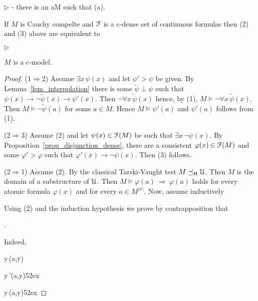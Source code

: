 \documentclass[10pt,oneside]{amsproc}
\newcommand{\mylabel}[1]{{#1}\hfill}
\renewenvironment{itemize}
  {\begin{list}{$\triangleright$}{%
  \setlength{\parskip}{0mm}
  \setlength{\topsep}{.4\baselineskip}
  \setlength{\rightmargin}{0mm}
  \setlength{\listparindent}{0mm}
  \setlength{\itemindent}{0mm}
  \setlength{\labelwidth}{3ex}
  \setlength{\itemsep}{.2\baselineskip}
  \setlength{\parsep}{.2\baselineskip}
  \setlength{\partopsep}{0mm}
  \setlength{\labelsep}{1ex}
  \setlength{\leftmargin}{\labelwidth+\labelsep}
  \let\makelabel\mylabel}}{%
\end{list}}
\def\forallH{\forall}
\begin{document}
{\begin{proposition}
\begin{itemize}
    \noindent\kern-\leftmargin
    {\textrm{ there is an }a\in M\textrm{ such that }\neg\psi(a).}
  \end{itemize}
  If $M$ is Cauchy compelte and ${\EuScript F}$ is a c-dense set of continuous formulas then (2) and (3) above are equivalent to
  \begin{itemize}
    \item[1$'$.] $M$ is a c-model.
  \end{itemize}
\end{proposition}

\begin{proof}
  (1$\Rightarrow$2) Assume $\exists x\,\psi(x)$ and let $\psi'>\psi$ be given.
  By Lemma~\ref{lem_interpolation} there is some $\tilde{\psi}\perp\psi$ such that  $\psi(x)\rightarrow\neg\tilde{\psi}(x)\rightarrow\psi'(x)$.
  Then $\neg\forallH x\,\tilde{\psi}(x)$ hence, by (1), $M\models\neg\forallH x\,\tilde{\psi}(x)$.
  Then $M\models\neg\tilde{\psi}(a)$ for some $a\in M$. Hence $M\models\psi'(a)$ and $\psi'(a)$ follows from (1).

  (2$\Rightarrow$3)
  Assume (2) and let $\psi(x)\in{\EuScript F}(M)$ be such that $\exists x\,\neg\psi(x)$.
  By Proposition~\ref{prop_disjunction_dense}, there are a consistent $\varphi(x)\in{\EuScript F}(M)$ and some $\varphi'>\varphi$ such that $\varphi'(x)\rightarrow\neg\psi(x)$.
  Then (3) follows.

  (2$\Rightarrow$1)
  Assume (2).
  By the classical Tarski-Vaught test $M\preceq_{\sf H}{\EuScript U}$.
  Then $M$ is the domain of a substructure of ${\EuScript U}$.
  Then $M\models\varphi(a)\ \Rightarrow\ \varphi(a)$ holds for every atomic formula $\varphi(x)$ and for every $a\in M^{|x|}$.
  Now, assume inductively
  

  Using (2) and the induction hypothesis we prove by contrapposition that

  \ceq{\hfill M\models\forallH y\,\varphi(a,y)}{\Rightarrow}{\forallH y\,\varphi(a,y)}.

  Indeed,

  \ceq{\hfill\neg\forallH y\,\varphi(a,y)}
  {\Rightarrow}{\exists y\,\neg\varphi(a,y)}
  
  \ceq{}
  {\Rightarrow}{\exists y\,\neg\varphi'(a,y)}\hfill {}\kern52ex
  
  \ceq{}
  {\Rightarrow}{\exists y\,\neg\psi(a,y)}\hfill{}\kern52ex%
  

\end{proof}}
\end{document}
